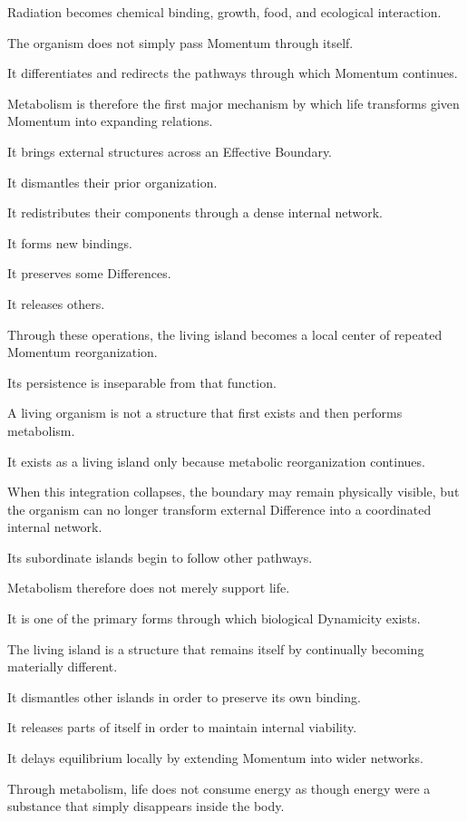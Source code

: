 Radiation becomes chemical binding, growth, food, and ecological interaction.

The organism does not simply pass Momentum through itself.

It differentiates and redirects the pathways through which Momentum continues.

Metabolism is therefore the first major mechanism by which life transforms given Momentum into expanding relations.

It brings external structures across an Effective Boundary.

It dismantles their prior organization.

It redistributes their components through a dense internal network.

It forms new bindings.

It preserves some Differences.

It releases others.

Through these operations, the living island becomes a local center of repeated Momentum reorganization.

Its persistence is inseparable from that function.

A living organism is not a structure that first exists and then performs metabolism.

It exists as a living island only because metabolic reorganization continues.

When this integration collapses, the boundary may remain physically visible, but the organism can no longer transform external Difference into a coordinated internal network.

Its subordinate islands begin to follow other pathways.

Metabolism therefore does not merely support life.

It is one of the primary forms through which biological Dynamicity exists.

The living island is a structure that remains itself by continually becoming materially different.

It dismantles other islands in order to preserve its own binding.

It releases parts of itself in order to maintain internal viability.

It delays equilibrium locally by extending Momentum into wider networks.

Through metabolism, life does not consume energy as though energy were a substance that simply disappears inside the body.

